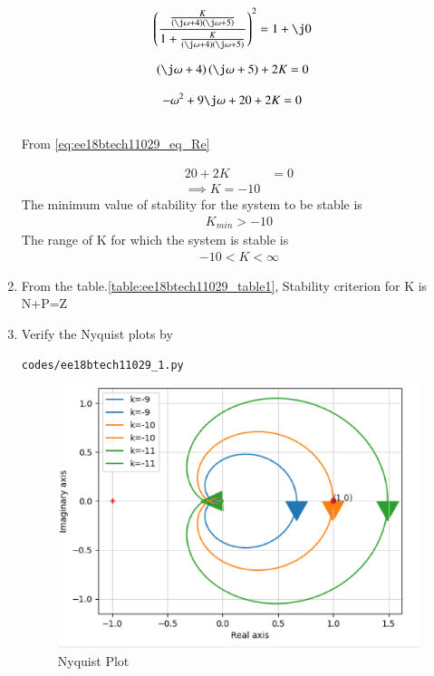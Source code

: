 \begin{enumerate}[label=\thesubsection.\arabic*.,ref=\thesubsection.\theenumi]
\begin{align}
    \brak{\frac{\frac{K}{\brak{\j\omega+4}\brak{\j\omega+5}}}{1+\frac{K}{\brak{\j\omega+4}\brak{\j\omega+5}}}}^2 &= 1+\j0
\end{align}

\begin{align}
    \brak{\j\omega+4}\brak{\j\omega+5}+2K &=0
\end{align}

\begin{align}
    -\omega^2 + 9\j\omega +20+2K &=0 
\end{align}
\\
From  \eqref{eq:ee18btech11029_eq_Re}

\begin{align}
    20 + 2K &= 0\\
    \implies K=-10
\end{align}
The minimum value of stability for the system to be stable is
\begin{align}
    K_{min} > -10
\end{align}
The range of K for which the system is stable is 
\begin{align}
    -10 < K < \infty
\end{align}


\item From the table.\ref{table:ee18btech11029_table1}, 
Stability criterion for K is N+P=Z


\begin{table}[!h]
\centering

\caption{}
\label{table:ee18btech11029_table1}
\end{table}


\item Verify the Nyquist plots by
\begin{lstlisting}
codes/ee18btech11029_1.py
\end{lstlisting}


\begin{figure}[h!]
\centering
  \includegraphics[width=\columnwidth]{./figs/ee18btech11029/Nyquist.eps}
  \caption{Nyquist Plot}
  \label{fig:ee18btech11029_2}
\end{figure}






\end{enumerate}
